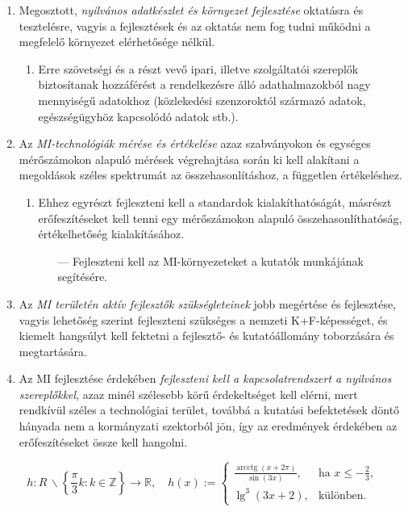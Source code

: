 \documentclass[
]{thesis-ekf}
\DeclareMathOperator{\arcctg}{arcctg}
\theoremstyle{definition}
\theoremstyle{remark}
\begin{document}
\begin{enumerate}
\begin{enumerate}
	\end{enumerate}
	\item Megosztott, \emph{nyilvános adatkészlet és környezet fejlesztése} oktatásra és tesztelésre, vagyis a fejlesztések és az oktatás nem fog tudni működni a megfelelő környezet elérhetősége nélkül.
	\begin{enumerate}
		\item Erre szövetségi és a részt vevő ipari, illetve szolgáltatói szereplők biztosítanak hozzáférést a rendelkezésre álló adathalmazokból nagy mennyiségű adatokhoz (közlekedési szenzoroktól származó adatok, egészségügyhöz kapcsolódó adatok stb.).
	\end{enumerate}
	\item Az \emph{MI-technológiák mérése és értékelése} azaz szabványokon és egységes mérőszámokon alapuló mérések végrehajtása során ki kell alakítani a megoldások széles spektrumát az összehasonlításhoz, a független értékeléshez.
	\begin{enumerate}
		\item Ehhez egyrészt fejleszteni kell a standardok kialakíthatóságát, másrészt erőfeszítéseket kell tenni egy mérőszámokon alapuló összehasonlíthatóság, értékelhetőség kialakításához.
		\begin{enumerate}
			\item[---] Fejleszteni kell az MI-környezeteket a kutatók munkájának segítésére.
		\end{enumerate}
	\end{enumerate}
	\item Az \emph{MI területén aktív fejlesztők szükségleteinek} jobb megértése és fejlesztése, vagyis lehetőség szerint fejleszteni szükséges a nemzeti K+F-képességet, és kiemelt hangsúlyt kell fektetni a fejlesztő- és kutatóállomány toborzására és megtartására.
	\item Az MI fejlesztése érdekében \emph{fejleszteni kell a kapcsolatrendszert a nyilvános szereplőkkel}, azaz minél szélesebb körű érdekeltséget kell elérni, mert rendkívül széles a technológiai terület, továbbá a kutatási befektetések döntő hányada nem a kormányzati szektorból jön, így az eredmények érdekében az erőfeszítéseket össze kell hangolni.
\end{enumerate}

\begin{equation} \label{keplet}
	h: R\,\backslash\left\{\frac{\pi}{3}k:k\in\mathbb{Z}\right\} \to \mathbb{R},\quad h(x) :=
	\begin{cases}
		\frac{\arcctg(x+2\pi)}{\sin(3x)},& \text{ha }x \leq - \frac{2}{3},\\
		\lg^{3}(3x+2),& \text{különben. }
	\end{cases}
\end{equation}
\end{document}

